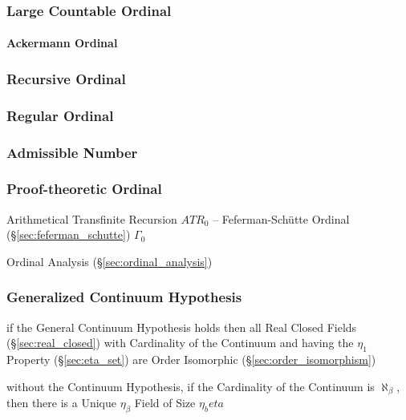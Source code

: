 \subsubsection{Large Countable Ordinal}\label{sec:large_countable}

\paragraph{Ackermann Ordinal}\label{sec:ackermann_ordinal}\hfill



\subsubsection{Recursive Ordinal}\label{sec:recursive_ordinal}

\subsubsection{Regular Ordinal}\label{sec:regular_ordinal}

\subsubsection{Admissible Number}\label{sec:admissible_ordinal}

\subsubsection{Proof-theoretic Ordinal}\label{sec:proof_ordinal}

Arithmetical Transfinite Recursion $ATR_0$ -- Feferman-Sch\"utte
Ordinal (\S\ref{sec:feferman_schutte}) $\Gamma_0$

Ordinal Analysis (\S\ref{sec:ordinal_analysis})



\subsubsection{Generalized Continuum Hypothesis}
\label{sec:generalized_continuum}

if the General Continuum Hypothesis holds then all Real Closed Fields
(\S\ref{sec:real_closed}) with Cardinality of the Continuum and having the
$\eta_1$ Property (\S\ref{sec:eta_set}) are Order Isomorphic
(\S\ref{sec:order_isomorphism})

without the Continuum Hypothesis, if the Cardinality of the Continuum is
$\aleph_\beta$, then there is a Unique $\eta_\beta$ Field of Size $\eta_beta$

